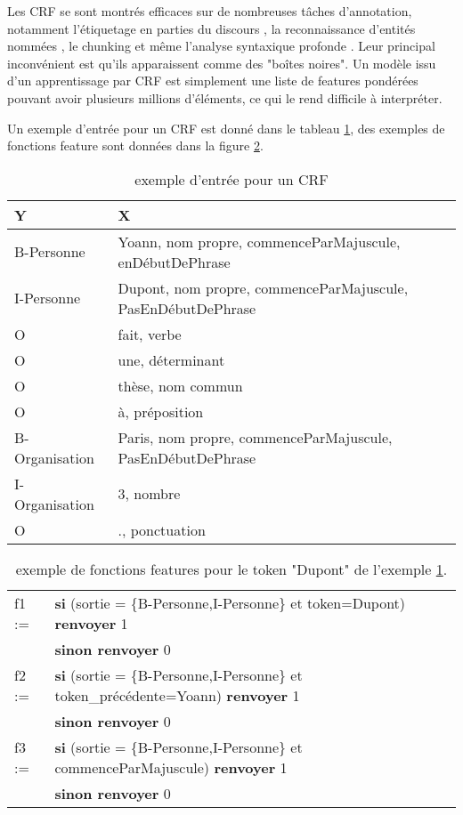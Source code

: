 \documentclass[PhD-Yoann-Dupont.tex]{subfiles}
\begin{document}
Les CRF se sont montrés efficaces sur de nombreuses tâches d'annotation, notamment l'étiquetage en parties du discours \citep{constant2011integrer}, la reconnaissance d'entités nommées \citep{McCallumLi03,dupont2014reconnaisseur, raymond2013robust}, le chunking \citep{Sha03} et même l'analyse syntaxique profonde \citep{finkel2008efficient,Tsuruoka09}. Leur principal inconvénient est qu'ils apparaissent comme des "boîtes noires". Un modèle issu d'un apprentissage par CRF est simplement une liste de features pondérées pouvant avoir plusieurs millions d'éléments, ce qui le rend difficile à interpréter.

Un exemple d'entrée pour un CRF est donné dans le tableau \ref{tab:CRF-input-example}, des exemples de fonctions feature sont données dans la figure \ref{tab:CRF-feature-function-example}.

\begin{table}[ht!]
\begin{tabular}{|l|l|}
\hline
Y              & X \\
\hline
B-Personne     & Yoann, nom propre, commenceParMajuscule, enDébutDePhrase \\
I-Personne     & Dupont, nom propre, commenceParMajuscule, PasEnDébutDePhrase \\
O              & fait, verbe \\
O              & une, déterminant \\
O              & thèse, nom commun \\
O              & à, préposition \\
B-Organisation & Paris, nom propre, commenceParMajuscule, PasEnDébutDePhrase \\
I-Organisation & 3, nombre \\
O              & ., ponctuation \\
\hline
\end{tabular}
\caption{exemple d'entrée pour un CRF}
\label{tab:CRF-input-example}
\end{table}

\begin{table}[ht!]
\begin{tabular}{ll}
f1 := & \textbf{si} (sortie = \{B-Personne,I-Personne\} et token=Dupont) \textbf{renvoyer} 1 \\
      & \textbf{sinon renvoyer} 0 \\
f2 := & \textbf{si} (sortie = \{B-Personne,I-Personne\} et token\_précédente=Yoann) \textbf{renvoyer} 1 \\
      & \textbf{sinon renvoyer} 0 \\
f3 := & \textbf{si} (sortie = \{B-Personne,I-Personne\} et commenceParMajuscule) \textbf{renvoyer} 1 \\
      & \textbf{sinon renvoyer} 0 \\
\end{tabular}
\caption{exemple de fonctions features pour le token "Dupont" de l'exemple \ref{tab:CRF-input-example}.}
\label{tab:CRF-feature-function-example}
\end{table}
\end{document}
